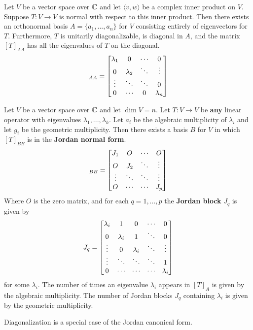 \begin{thm} Let $V$ be a vector space over $\operatorname{\mathbb{C}}$ and let $\langle v,w\rangle$ be a complex inner product on $V$. Suppose $T : V \to V$ is normal with respect to this inner product. Then there exists an orthonormal basis $A=\{a_1,...,a_n\}$ for $V$ consisting entirely of eigenvectors for $T$. Furthermore, $T$ is unitarily diagonalizable, is diagonal in $A$, and the matrix $[T]_{AA}$ has all the eigenvalues of $T$ on the diagonal.
\begin{equation}
    [T]_{AA} = \m{\lambda_1&0&\cdots&0\\
    0&\lambda_2&\ddots&\vdots\\
    \vdots&\ddots&\ddots&0\\
    0&\cdots&0&\lambda_n}
\end{equation}
\end{thm}

\begin{defn} Let $V$ be a vector space over $\operatorname{\mathbb{C}}$ and let $\dim V = n$. Let $T:V\to V$ be \textbf{any} linear operator with eigenvalues $\lambda_1,...,\lambda_k$. Let $a_i$ be the algebraic multiplicity of $\lambda_i$ and let $g_i$ be the geometric multiplicity. Then there exists a basis $B$ for $V$ in which $[T]_{BB}$ is in the \textbf{Jordan normal form}.
\begin{equation}
    [T]_{BB} = \m{J_1 & O & \cdots & O\\O&J_2&\ddots & \vdots\\
    \vdots & \ddots & \ddots & \vdots\\
    O & \cdots & \cdots & J_p}
\end{equation}
Where $O$ is the zero matrix, and for each $q=1,...,p$ the \textbf{Jordan block} $J_q$ is given by
\begin{equation}
    J_q = \begin{bmatrix}\lambda_i & 1 & 0 & \cdots & 0\\
    0 & \lambda_i & 1 & \ddots & 0\\
    \vdots & 0& \lambda_i & \ddots & \vdots\\
    \vdots & \ddots & \ddots &\ddots & 1\\
    0 & \cdots & \cdots & \cdots & \lambda_i\end{bmatrix}
\end{equation}
for some $\lambda_i$.
The number of times an eigenvalue $\lambda_i$ appears in $[T]_A$ is given by the algebraic multiplicity. The number of Jordan blocks $J_q$ containing $\lambda_i$ is given by the geometric multiplicity.
\end{defn}
\begin{remark*}
    Diagonalization is a special case of the Jordan canonical form.
\end{remark*}

